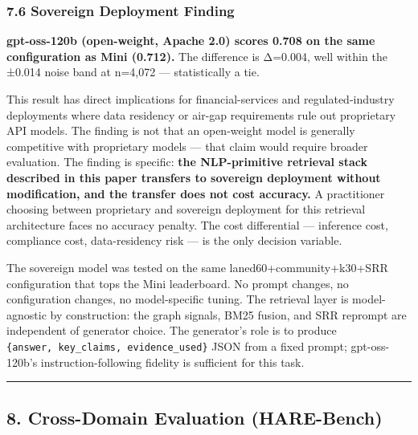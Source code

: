 \documentclass[
]{article}
\begin{document}
\subsubsection{7.6 Sovereign Deployment
Finding}\label{sovereign-deployment-finding}

\textbf{gpt-oss-120b (open-weight, Apache 2.0) scores 0.708 on the same
configuration as Mini (0.712).} The difference is Δ=0.004, well within
the ±0.014 noise band at n=4,072 --- statistically a tie.

This result has direct implications for financial-services and
regulated-industry deployments where data residency or air-gap
requirements rule out proprietary API models. The finding is not that an
open-weight model is generally competitive with proprietary models ---
that claim would require broader evaluation. The finding is specific:
\textbf{the NLP-primitive retrieval stack described in this paper
transfers to sovereign deployment without modification, and the transfer
does not cost accuracy.} A practitioner choosing between proprietary and
sovereign deployment for this retrieval architecture faces no accuracy
penalty. The cost differential --- inference cost, compliance cost,
data-residency risk --- is the only decision variable.

The sovereign model was tested on the same laned60+community+k30+SRR
configuration that tops the Mini leaderboard. No prompt changes, no
configuration changes, no model-specific tuning. The retrieval layer is
model-agnostic by construction: the graph signals, BM25 fusion, and SRR
reprompt are independent of generator choice. The generator's role is to
produce \texttt{\{answer,\ key\_claims,\ evidence\_used\}} JSON from a
fixed prompt; gpt-oss-120b's instruction-following fidelity is
sufficient for this task.

\begin{center}\rule{0.5\linewidth}{0.5pt}\end{center}

\subsection{8. Cross-Domain Evaluation
(HARE-Bench)}\label{cross-domain-evaluation-hare-bench}
\end{document}
